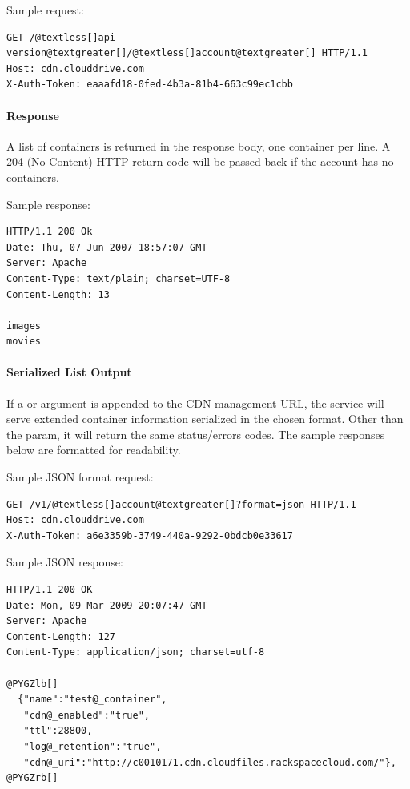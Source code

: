 \documentclass[letterpaper,10pt,english]{manual}
\begin{document}
Sample request:

\begin{Verbatim}[commandchars=@\[\]]
GET /@textless[]api version@textgreater[]/@textless[]account@textgreater[] HTTP/1.1
Host: cdn.clouddrive.com
X-Auth-Token: eaaafd18-0fed-4b3a-81b4-663c99ec1cbb
\end{Verbatim}


\paragraph{Response}

A list of containers is returned in the response body, one container per
line. A 204 (No Content) HTTP return code will be passed back if the
account has no containers.

Sample response:

\begin{Verbatim}[commandchars=@\[\]]
HTTP/1.1 200 Ok
Date: Thu, 07 Jun 2007 18:57:07 GMT
Server: Apache
Content-Type: text/plain; charset=UTF-8
Content-Length: 13

images
movies
\end{Verbatim}


\paragraph{Serialized List Output}

If a  or  argument is appended to the CDN
management URL, the service will serve extended container information
serialized in the chosen format.  Other than the 
param, it will return the same status/errors codes.  The sample responses
below are formatted for readability.

Sample JSON format request:

\begin{Verbatim}[commandchars=@\[\]]
GET /v1/@textless[]account@textgreater[]?format=json HTTP/1.1
Host: cdn.clouddrive.com
X-Auth-Token: a6e3359b-3749-440a-9292-0bdcb0e33617
\end{Verbatim}

Sample JSON response:

\begin{Verbatim}[commandchars=@\[\]]
HTTP/1.1 200 OK
Date: Mon, 09 Mar 2009 20:07:47 GMT
Server: Apache
Content-Length: 127
Content-Type: application/json; charset=utf-8

@PYGZlb[]
  {"name":"test@_container",
   "cdn@_enabled":"true",
   "ttl":28800,
   "log@_retention":"true",
   "cdn@_uri":"http://c0010171.cdn.cloudfiles.rackspacecloud.com/"},
@PYGZrb[]
\end{Verbatim}
\end{document}
